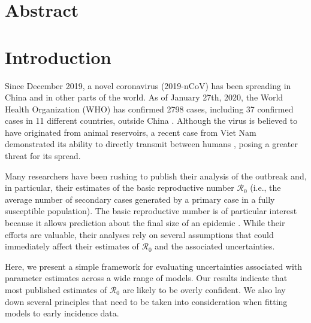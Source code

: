 \documentclass[12pt]{article}
\date{\today}
\begin{document}
\begin{flushleft}{
	\Large
	\textbf{}
}

\bigskip

\end{flushleft}

\section*{Abstract}

\pagebreak

\section{Introduction}

Since December 2019, a novel coronavirus (2019-nCoV) has been
spreading in China and in other parts of the world.
As of January 27th, 2020, the World Health Organization (WHO) has
confirmed 2798 cases, including 37 confirmed cases in 11 different
countries, outside China \citep{who27report}.
Although the virus is believed to have originated
from animal reservoirs, a recent case from Viet Nam
demonstrated its ability to directly transmit between
humans \citep{who26report},
posing a greater threat for its spread.

Many researchers have been rushing to publish their 
analysis of the outbreak \citep{imaincov, riouncov,readncov,zhaoncov,majumderncov,liuncov} 
and, in particular, their
estimates of the basic 
reproductive number $\mathcal R_0$ (i.e., the 
average number of secondary cases generated 
by a primary case in a fully susceptible population).
The basic reproductive number is of particular interest 
because it allows prediction about the final size of an epidemic \citep{anderson1991infectious, ma2006generality, arino2007final, andreasen2011final, miller2012note}.
While their efforts are valuable, their analyses rely on several
assumptions that could immediately affect their estimates of $\mathcal R_0$ and
the associated uncertainties.

Here, we present a simple framework for evaluating uncertainties 
associated with parameter estimates
across a wide range of models.
Our results indicate that most published estimates of $\mathcal R_0$
are likely to be overly confident. 
We also lay down several principles that need to be taken into
consideration when fitting models to early incidence data.
\end{document}
